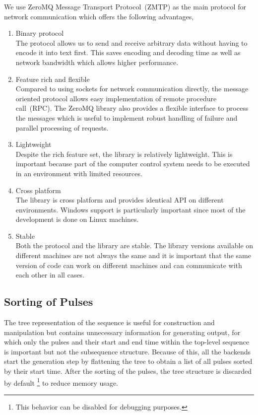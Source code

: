 We use ZeroMQ Message Transport Protocol~(ZMTP) as the main protocol for network communication
which offers the following advantages,
\begin{enumerate}
\item Binary protocol\\
  The protocol allows us to send and receive arbitrary data without having to encode it
  into text first. This saves encoding and decoding time as well as network bandwidth
  which allows higher performance.
\item Feature rich and flexible\\
  Compared to using sockets for network communication directly,
  the message oriented protocol allows easy implementation of remote procedure call~(RPC).
  The ZeroMQ library also provides a flexible interface to process the messages
  which is useful to implement robust handling of failure
  and parallel processing of requests.
\item Lightweight\\
  Despite the rich feature set, the library is relatively lightweight.
  This is important because part of the computer control system
  needs to be executed in an environment with limited resources.
\item Cross platform\\
  The library is cross platform and provides identical API on different environments.
  Windows support is particularly important since most of the development is done
  on Linux machines.
\item Stable\\
  Both the protocol and the library are stable.
  The library versions available on different machines are not always the same
  and it is important that the same version of code can work on different machines
  and can communicate with each other in all cases.
\end{enumerate}

\subsection{Sorting of Pulses}
\label{ch:computer-control:backend:sort-pulse}
The tree representation of the sequence is useful for construction and manipulation
but contains unnecessary information for generating output,
for which only the pulses and their start and end time
within the top-level sequence is important but not the subsequence structure.
Because of this, all the backends start the generation step by
flattening the tree to obtain a list of all pulses sorted by their start time.
After the sorting of the pulses, the tree structure is discarded by default
\footnote{This behavior can be disabled for debugging purposes.} to reduce memory usage.


